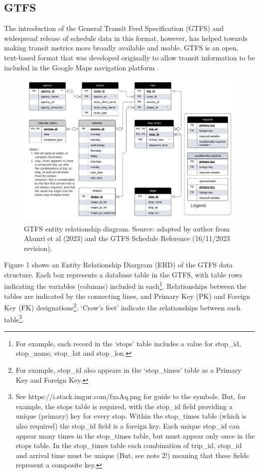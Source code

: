 \documentclass[preprint, 3p,
authoryear]{elsarticle} %
\begin{document}
\hypertarget{gtfs}{%
\subsection{GTFS}\label{gtfs}}

The introduction of the General Transit Feed Specification (GTFS) and
widespread release of schedule data in this format, however, has helped
towards making transit metrics more broadly available and usable. GTFS
is an open, text-based format that was developed originally to allow
transit information to be included in the Google Maps navigation
platform \citep{GTFS}.

\begin{figure}
\includegraphics[width=1\linewidth]{graphics/GTFS} \caption{GTFS entity relationship diagram. Source: adapted by author from Alamri et al (2023) and the GTFS Schedule Reference (16/11/2023 revision).}\label{fig:GTFS_ERD}
\end{figure}

Figure 1 shows an Entity Relationship Diargram (ERD) of the GTFS data
structure. Each box represents a database table in the GTFS, with table
rows indicating the variables (columns) included in each\footnote{For
  example, each record in the `stops' table includes a value for
  stop\_id, stop\_name, stop\_lat and stop\_lon.}. Relationships between
the tables are indicated by the connecting lines, and Primary Key (PK)
and Foreign Key (FK) designations\footnote{For example, stop\_id also
  appears in the `stop\_times' table as a Primary Key and Foreign Key.}.
`Crow's feet' indicate the relationships between each table\footnote{See
  https://i.stack.imgur.com/fxaAq.png for guide to the symbols. But, for
  example, the stops table is required, with the stop\_id field
  providing a unique (primary) key for every stop. Within the
  stop\_times table (which is also required) the stop\_id field is a
  foreign key. Each unique stop\_id can appear many times in the
  stop\_times table, but must appear only once in the stops table. In
  the stop\_times table each combination of trip\_id, stop\_id and
  arrival time must be unique (But, see note 2!) meaning that these
  fields represent a composite key.}.
\end{document}
